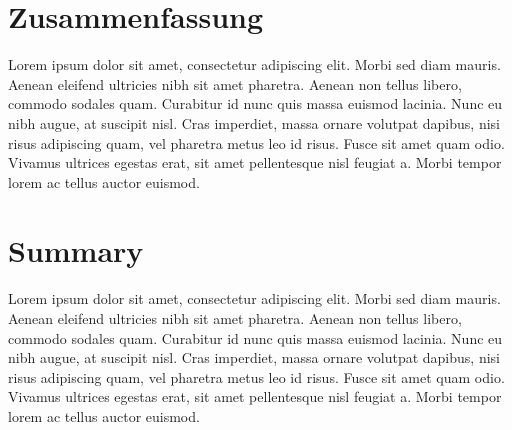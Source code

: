 

{}%
\chapter*{Zusammenfassung}%
\label{sec:zusammenfassung-ger}%
%

 Lorem ipsum dolor sit amet, consectetur adipiscing elit. Morbi sed diam mauris. Aenean eleifend ultricies nibh sit amet pharetra. Aenean non tellus libero, commodo sodales quam. Curabitur id nunc quis massa euismod lacinia. Nunc eu nibh augue, at suscipit nisl. Cras imperdiet, massa ornare volutpat dapibus, nisi risus adipiscing quam, vel pharetra metus leo id risus. Fusce sit amet quam odio. Vivamus ultrices egestas erat, sit amet pellentesque nisl feugiat a. Morbi tempor lorem ac tellus auctor euismod.  

\par

\newpage  

\chapter*{Summary}%
\label{sec:zusammenfassung-eng}%
%
 Lorem ipsum dolor sit amet, consectetur adipiscing elit. Morbi sed diam mauris. Aenean eleifend ultricies nibh sit amet pharetra. Aenean non tellus libero, commodo sodales quam. Curabitur id nunc quis massa euismod lacinia. Nunc eu nibh augue, at suscipit nisl. Cras imperdiet, massa ornare volutpat dapibus, nisi risus adipiscing quam, vel pharetra metus leo id risus. Fusce sit amet quam odio. Vivamus ultrices egestas erat, sit amet pellentesque nisl feugiat a. Morbi tempor lorem ac tellus auctor euismod.  
\par 
